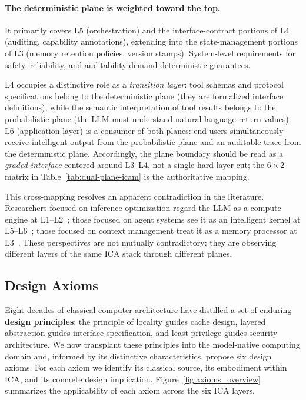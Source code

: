 \paragraph{The deterministic plane is weighted toward the top.}
It primarily covers L5 (orchestration) and the interface-contract portions of L4 (auditing, capability annotations), extending into the state-management portions of L3 (memory retention policies, version stamps). System-level requirements for safety, reliability, and auditability demand deterministic guarantees.

L4 occupies a distinctive role as a \textit{transition layer}: tool schemas and protocol specifications belong to the deterministic plane (they are formalized interface definitions), while the semantic interpretation of tool results belongs to the probabilistic plane (the LLM must understand natural-language return values). L6 (application layer) is a consumer of both planes: end users simultaneously receive intelligent output from the probabilistic plane and an auditable trace from the deterministic plane. Accordingly, the plane boundary should be read as a \textit{graded interface} centered around L3--L4, not a single hard layer cut; the $6\times 2$ matrix in Table~\ref{tab:dual-plane-icam} is the authoritative mapping.

This cross-mapping resolves an apparent contradiction in the literature. Researchers focused on inference optimization regard the LLM as a compute engine at L1--L2~\cite{kwon2023pagedattention,zhou2024efficientinference}; those focused on agent systems see it as an intelligent kernel at L5--L6~\cite{openai_codex_overview_2026,anthropic_claudecode_overview_2026}; those focused on context management treat it as a memory processor at L3~\cite{memgpt2023,memoryos2025}. These perspectives are not mutually contradictory; they are observing different layers of the same ICA stack through different planes.

\subsection{Design Axioms}
\label{sec:icam-axioms}

Eight decades of classical computer architecture have distilled a set of enduring \textbf{design principles}: the principle of locality guides cache design, layered abstraction guides interface specification, and least privilege guides security architecture. We now transplant these principles into the model-native computing domain and, informed by its distinctive characteristics, propose six design axioms. For each axiom we identify its classical source, its embodiment within ICA, and its concrete design implication. Figure~\ref{fig:axioms_overview} summarizes the applicability of each axiom across the six ICA layers.


